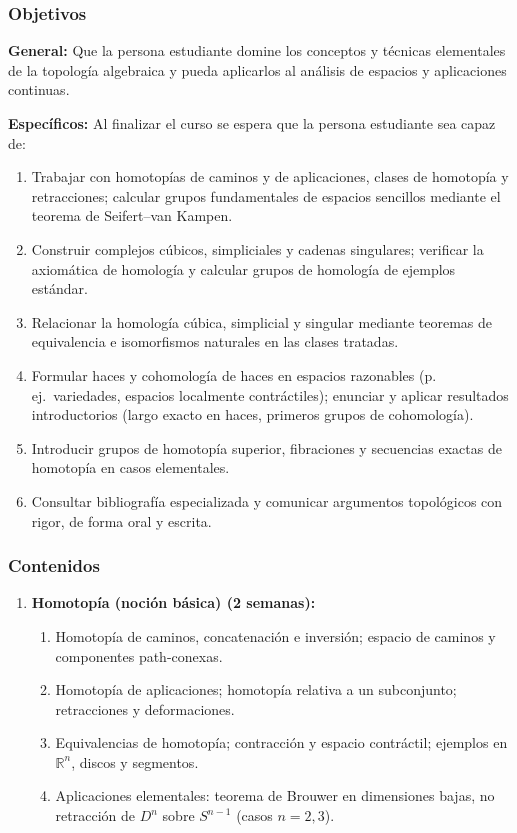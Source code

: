 \begin{refsection}
\subsubsection*{Objetivos}

\textbf{General:} Que la persona estudiante domine los conceptos y técnicas elementales de la topología algebraica y pueda aplicarlos al análisis de espacios y aplicaciones continuas.

\textbf{Específicos:} Al finalizar el curso se espera que la persona estudiante sea capaz de:

\begin{enumerate}
\item Trabajar con homotopías de caminos y de aplicaciones, clases de homotopía y retracciones; calcular grupos fundamentales de espacios sencillos mediante el teorema de Seifert--van Kampen.
\item Construir complejos cúbicos, simpliciales y cadenas singulares; verificar la axiomática de homología y calcular grupos de homología de ejemplos estándar.
\item Relacionar la homología cúbica, simplicial y singular mediante teoremas de equivalencia e isomorfismos naturales en las clases tratadas.
\item Formular haces y cohomología de haces en espacios razonables (p. ej.\ variedades, espacios localmente contráctiles); enunciar y aplicar resultados introductorios (largo exacto en haces, primeros grupos de cohomología).
\item Introducir grupos de homotopía superior, fibraciones y secuencias exactas de homotopía en casos elementales.
\item Consultar bibliografía especializada y comunicar argumentos topológicos con rigor, de forma oral y escrita.
\end{enumerate}

\subsubsection*{Contenidos}

\begin{enumerate}
\item \textbf{Homotopía (noción básica) (2 semanas):}
\begin{enumerate}
    \item Homotopía de caminos, concatenación e inversión; espacio de caminos y componentes path-conexas.
    \item Homotopía de aplicaciones; homotopía relativa a un subconjunto; retracciones y deformaciones.
    \item Equivalencias de homotopía; contracción y espacio contráctil; ejemplos en $\mathbb{R}^n$, discos y segmentos.
    \item Aplicaciones elementales: teorema de Brouwer en dimensiones bajas, no retracción de $D^n$ sobre $S^{n-1}$ (casos $n=2,3$).
\end{enumerate}


\end{enumerate}
\end{refsection}
